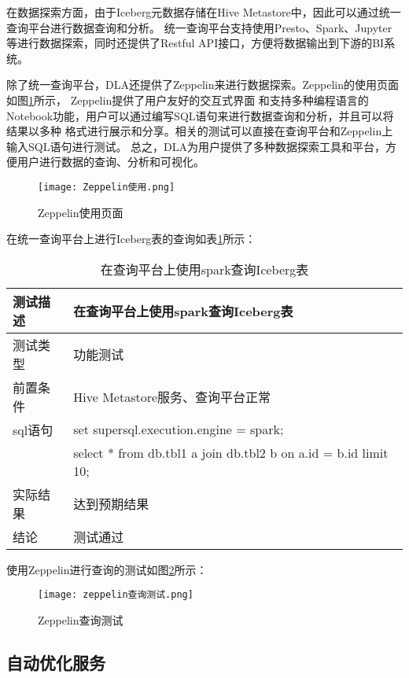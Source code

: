 在数据探索方面，由于Iceberg元数据存储在Hive Metastore中，因此可以通过统一查询平台进行数据查询和分析。
统一查询平台支持使用Presto、Spark、Jupyter等进行数据探索，同时还提供了Restful API接口，方便将数据输出到下游的BI系统。

除了统一查询平台，DLA还提供了Zeppelin来进行数据探索。Zeppelin的使用页面如图\ref{fig:Zeppelin使用}所示，
Zeppelin提供了用户友好的交互式界面
和支持多种编程语言的Notebook功能，用户可以通过编写SQL语句来进行数据查询和分析，并且可以将结果以多种
格式进行展示和分享。相关的测试可以直接在查询平台和Zeppelin上输入SQL语句进行测试。
总之，DLA为用户提供了多种数据探索工具和平台，方便用户进行数据的查询、分析和可视化。

\begin{figure}[H]
  \centering
  \texttt{[image: Zeppelin使用.png]}
  \caption{Zeppelin使用页面}
  \label{fig:Zeppelin使用}
\end{figure}

在统一查询平台上进行Iceberg表的查询如表\ref{tab:exampletable12}所示：

\begin{table}[H]
  \centering
  \caption{在查询平台上使用spark查询Iceberg表}
  \label{tab:exampletable12}
  \begin{tabular}{ll}
    \toprule
    测试描述         & 在查询平台上使用spark查询Iceberg表         \\
    \midrule
    测试类型         & 功能测试         \\
    前置条件         & Hive Metastore服务、查询平台正常         \\
    sql语句         & set supersql.execution.engine = spark;    \\
                   & select * from db.tbl1 a join db.tbl2 b on a.id = b.id limit 10;       \\
    实际结果         & 达到预期结果           \\
    结论            & 测试通过           \\
    \bottomrule
  \end{tabular}
\end{table}

使用Zeppelin进行查询的测试如图\ref{fig:badge1}所示：

\begin{figure}[H]
  \centering
  \texttt{[image: zeppelin查询测试.png]}
  \caption{Zeppelin查询测试}
  \label{fig:badge1}
\end{figure}

\subsection{自动优化服务}

